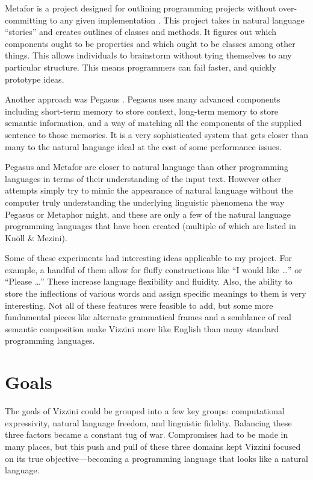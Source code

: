 \documentclass[titlepage]{article}
\newcommand{\langName}{Vizzini}
\begin{document}
Metafor is a project designed for outlining programming projects without over-committing to any given implementation \cite{Liu2005MetaforVS}. This project takes in natural language “stories” and creates outlines of classes and methods. It figures out which components ought to be properties and which ought to be classes among other things. This allows individuals to brainstorm without tying themselves to any particular structure. This means programmers can fail faster, and quickly prototype ideas.

Another approach was Pegasus \cite{Knöll2006PegasusFS}. Pegasus uses many advanced components including short-term memory to store context, long-term memory to store semantic information, and a way of matching all the components of the supplied sentence to those memories. It is a very sophisticated system that gets closer than many to the natural language ideal at the cost of some performance issues.

Pegasus and Metafor are closer to natural language than other programming languages in terms of their understanding of the input text. However other attempts simply try to mimic the appearance of natural language without the computer truly understanding the underlying linguistic phenomena the way Pegasus or Metaphor might, and these are only a few of the natural language programming languages that have been created (multiple of which are listed in Knöll \& Mezini).

Some of these experiments had interesting ideas applicable to my project. For example, a handful of them allow for fluffy constructions like “I would like …” or “Please …” These increase language flexibility and fluidity. Also, the ability to store the inflections of various words and assign specific meanings to them is very interesting. Not all of these features were feasible to add, but some more fundamental pieces like alternate grammatical frames and a semblance of real semantic composition make \langName{} more like English than many standard programming languages.

\section*{Goals}
The goals of \langName{} could be grouped into a few key groups: computational expressivity, natural language freedom, and linguistic fidelity. Balancing these three factors became a constant tug of war. Compromises had to be made in many places, but this push and pull of these three domains kept \langName{} focused on its true objective---becoming a programming language that looks like a natural language.
\end{document}
